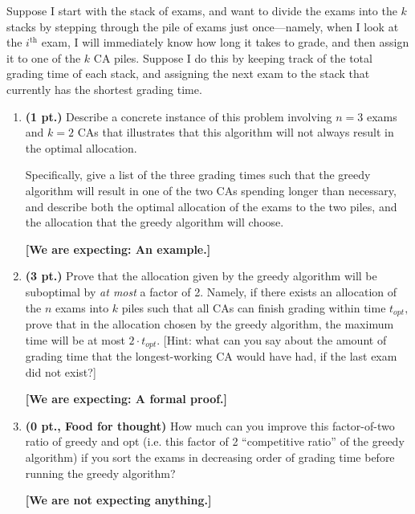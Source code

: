 \documentclass{article}
\begin{document}
\begin{enumerate}
    Suppose I start with the stack of exams, and want to divide the exams into
    the $k$ stacks by stepping through the pile of exams just once---namely,
    when I look at the $i^{\text{th}}$ exam, I will immediately know how long
    it takes to grade, and then assign it to one of the $k$ CA piles. Suppose I
    do this by keeping track of the total grading time of each stack, and
    assigning the next exam to the stack that currently has the shortest
    grading time.
    \begin{enumerate}
      \item \textbf{(1 pt.)} Describe a concrete instance of this problem
        involving $n=3$ exams and $k=2$ CAs that illustrates that this
        algorithm will not always result in the optimal allocation.

        Specifically, give a list of the three grading times such that the
        greedy algorithm will result in one of the two CAs spending longer than
        necessary, and describe both the optimal allocation of the exams to the
        two piles, and the allocation that the greedy algorithm will choose.

        \textbf{[We are expecting: An example.]}
      \item \textbf{(3 pt.)} Prove that the allocation given by the greedy
        algorithm will be suboptimal by \emph{at most} a factor of 2. Namely,
        if there exists an allocation of the $n$ exams into $k$ piles such that
        all CAs can finish grading within time $t_{opt},$ prove that in the
        allocation chosen by the greedy algorithm, the maximum time will be at
        most $2\cdot t_{opt}.$ [Hint: what can you say about the amount of
        grading time that the longest-working CA would have had, if the last
        exam did not exist?]

        \textbf{[We are expecting: A formal proof.]}
      \item \textbf{(0 pt., Food for thought)} How much can you improve this
        factor-of-two ratio of greedy and opt (i.e. this factor of 2
        ``competitive ratio'' of the greedy algorithm) if you sort the exams
        in decreasing order of grading time before running the greedy
        algorithm?

        \textbf{[We are not expecting anything.]}
\end{enumerate}
\end{enumerate}
\end{document}
